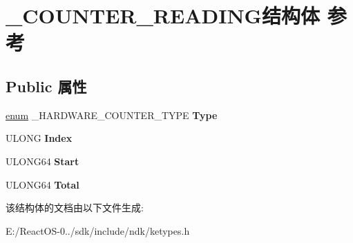 \hypertarget{struct___c_o_u_n_t_e_r___r_e_a_d_i_n_g}{}\section{\+\_\+\+C\+O\+U\+N\+T\+E\+R\+\_\+\+R\+E\+A\+D\+I\+N\+G结构体 参考}
\label{struct___c_o_u_n_t_e_r___r_e_a_d_i_n_g}
\subsection*{Public 属性}
\begin{DoxyCompactItemize}
\item 
\mbox{\label{struct___c_o_u_n_t_e_r___r_e_a_d_i_n_g_a65438fe91e821dc578b75fb11c61f5f9}} 
\hyperlink{interfaceenum}{enum} \+\_\+\+H\+A\+R\+D\+W\+A\+R\+E\+\_\+\+C\+O\+U\+N\+T\+E\+R\+\_\+\+T\+Y\+PE {\bfseries Type}
\item 
\mbox{\label{struct___c_o_u_n_t_e_r___r_e_a_d_i_n_g_a27e94aa26b318a6c3b141df119b8597b}} 
U\+L\+O\+NG {\bfseries Index}
\item 
\mbox{\label{struct___c_o_u_n_t_e_r___r_e_a_d_i_n_g_ad0468ebbc2cda9646316de8372647cd7}} 
U\+L\+O\+N\+G64 {\bfseries Start}
\item 
\mbox{\label{struct___c_o_u_n_t_e_r___r_e_a_d_i_n_g_ae54927109e5e8818f15d3ec83a8dbd07}} 
U\+L\+O\+N\+G64 {\bfseries Total}
\end{DoxyCompactItemize}


该结构体的文档由以下文件生成\+:\begin{DoxyCompactItemize}
\item 
E\+:/\+React\+O\+S-\/0../sdk/include/ndk/ketypes.\+h\end{DoxyCompactItemize}
